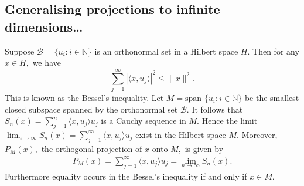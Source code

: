 \subsection{Generalising projections to infinite dimensions\ldots}
\begin{proposition}
Suppose $\mathcal B = \{u_{i} :  i\in \mathbb N\}$ is an orthonormal set in a Hilbert space $H.$ Then for any $x\in H,$ we have $$ \sum_{j=1}^{\infty} |\langle x, u_j\rangle|^2 \leqslant \|x\|^2.$$
This is known as the Bessel's inequality. Let $M= \overline{\text{span } \{u_i: i\in\mathbb N\}}$ be the smallest closed subspace spanned by the orthonormal set $\mathcal B.$ It follows that $S_n(x) = \sum_{j=1}^{n} \langle x, u_j\rangle u_j $ is a Cauchy sequence in $M.$  Hence the limit $\lim_{n\to\infty} S_n(x) =  \sum_{j=1}^{\infty} \langle x, u_j\rangle u_j $ exist in the Hilbert space $M$. Moreover, $P_M(x),$ the orthogonal projection of $x$ onto $M,$ is given by
\begin{align*}
P_M(x)= \sum_{j=1}^{\infty} \langle x, u_j\rangle u_j = \lim_{n\to\infty} S_n(x).
\end{align*}
Furthermore equality occurs in the Bessel's inequality if and only if $x\in M.$
\end{proposition}
